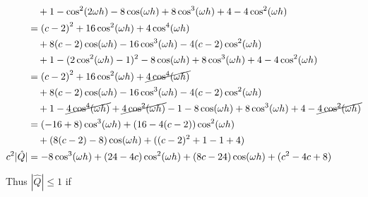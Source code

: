 \documentclass[11pt]{amsart}
\numberwithin{equation}{section}
\begin{document}
\begin{enumerate}[a)]
{\begin{align}
                            & \quad + 1 - \cos^2(2\omega h) - 8\cos(\omega h) + 8\cos^3(\omega h) + 4 - 4\cos^2(\omega h)                                                    \\
                            & = \left( c - 2\right)^2 + 16 \cos^2(\omega h) + 4 \cos^4(\omega h)                                                                             \\ \nonumber
                            & \quad + 8 (c-2) \cos(\omega h) - 16 \cos^3(\omega h) - 4 (c- 2) \cos^2 (\omega h)                                                              \\ \nonumber 
                            & \quad + 1 - (2\cos^2(\omega h) - 1)^2 - 8\cos(\omega h) + 8\cos^3(\omega h) + 4 - 4\cos^2(\omega h)                                            \\  
                            & = \left( c - 2\right)^2 + 16 \cos^2(\omega h) + \cancel{4 \cos^4(\omega h)}                                                                    \\ \nonumber
                            & \quad + 8 (c-2) \cos(\omega h) - 16 \cos^3(\omega h) - 4 (c- 2) \cos^2 (\omega h)                                                              \\ \nonumber 
                            & \quad + 1 - \cancel{4\cos^4(\omega h)} + \cancel{4\cos^2(\omega h)} - 1 - 8\cos(\omega h) + 8\cos^3(\omega h) + 4 - \cancel{4\cos^2(\omega h)} \\                                                        
                            & = (-16 + 8) \cos^3(\omega h) + (16 - 4(c - 2)) \cos^2(\omega h)                                                                                \\\nonumber
                            & \quad + (8(c-2) - 8) \cos(\omega h) + ((c-2)^2 + 1 - 1 + 4)                                                                                    \\ 
              c^2 |\hat Q|  & = - 8 \cos^3(\omega h) + (24 - 4c) \cos^2(\omega h) + (8c - 24) \cos(\omega h) + (c^2 -4c + 8)
          \end{align}
          
          Thus $|\hat Q| \le 1$ if 
          
}
\end{enumerate}
\end{document}
